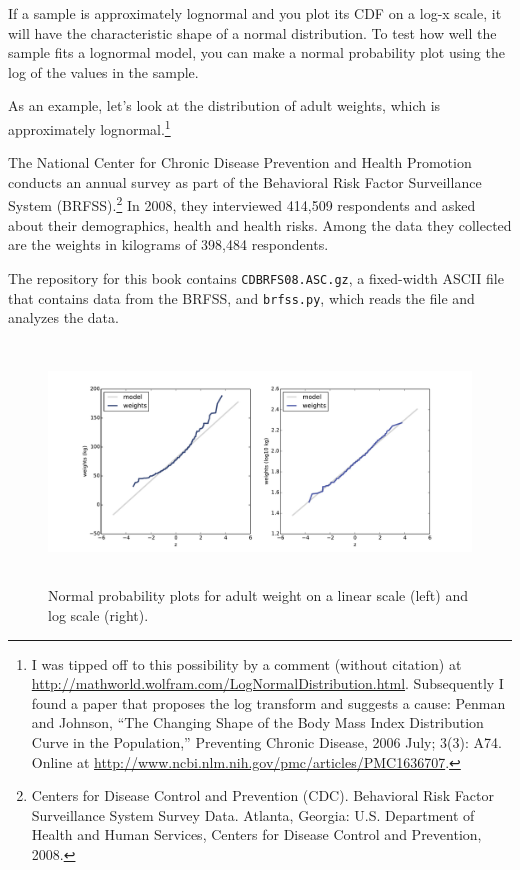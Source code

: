 \documentclass[12pt]{book}
\begin{document}
If a sample is approximately lognormal and you plot its CDF on a
log-x scale, it will have the characteristic shape of a normal
distribution.  To test how well the sample fits a lognormal model, you
can make a normal probability plot using the log of the values
in the sample.

As an example, let's look at the distribution of adult weights, which
is approximately lognormal.\footnote{I was tipped off to this
  possibility by a comment (without citation) at
  \url{http://mathworld.wolfram.com/LogNormalDistribution.html}.
  Subsequently I found a paper that proposes the log transform and
  suggests a cause: Penman and Johnson, ``The Changing Shape of the
  Body Mass Index Distribution Curve in the Population,'' Preventing
  Chronic Disease, 2006 July; 3(3): A74.  Online at
  \url{http://www.ncbi.nlm.nih.gov/pmc/articles/PMC1636707}.}

The National Center for Chronic Disease
Prevention and Health Promotion conducts an annual survey as part of
the Behavioral Risk Factor Surveillance System
(BRFSS).\footnote{Centers for Disease Control and Prevention
  (CDC). Behavioral Risk Factor Surveillance System Survey
  Data. Atlanta, Georgia: U.S. Department of Health and Human
  Services, Centers for Disease Control and Prevention, 2008.}  In
2008, they interviewed 414,509 respondents and asked about their
demographics, health and health risks.
Among the data they collected are the weights in kilograms of
398,484 respondents.

The repository for this book contains {\tt CDBRFS08.ASC.gz},
a fixed-width ASCII file that contains data from the BRFSS,
and {\tt brfss.py}, which reads the file and analyzes the data.

\begin{figure}
\centerline{
\includegraphics[height=2.5in]{figs/brfss_weight_normal.pdf}}
\caption{Normal probability plots for adult weight on a linear scale
  (left) and log scale (right).}
\label{brfss_weight_normal}
\end{figure}
\end{document}
